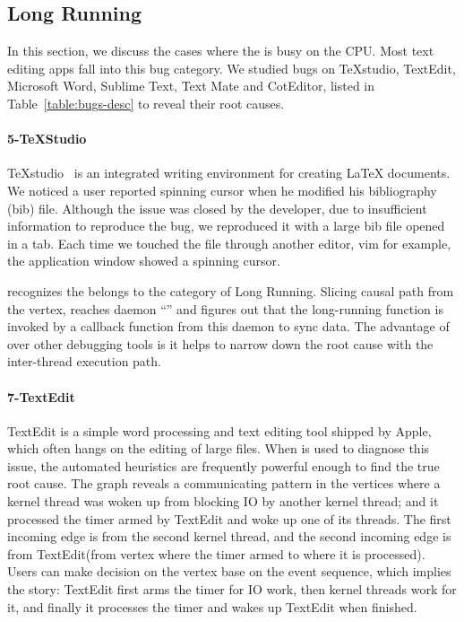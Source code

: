 \subsection{Long Running}

In this section, we discuss the cases where the \spinningnode is busy on the
CPU. Most text editing apps fall into this bug category. We studied bugs on
TeXstudio, TextEdit, Microsoft Word, Sublime Text, Text Mate and CotEditor,
listed in Table~\ref{table:bugs-desc} to reveal their root causes.


\paragraph{5-TeXStudio}

TeXstudio~\cite{TeXStudio} is an integrated writing environment for creating
LaTeX documents. We noticed a user reported spinning cursor when he
modified his bibliography (bib) file. Although the issue was closed by the developer, due to
insufficient information to reproduce the bug, we reproduced it with a large bib
file opened in a tab. Each time we touched the file through another editor, vim
for example, the application window showed a spinning cursor.

\xxx recognizes the \spinningnode belongs to the category of Long
Running. Slicing causal path from the vertex, \xxx reaches daemon
``'' and figures out that the long-running function is invoked by a callback
function from this daemon to sync data. The advantage of \xxx over other debugging tools is
it helps to narrow down the root cause with the inter-thread execution path.

\paragraph{7-TextEdit}

TextEdit is a simple word processing and text editing tool shipped by Apple, which
often hangs on the editing of large files. 
When \xxx is used to diagnose this issue, the automated heuristics are frequently
powerful enough to find the true root cause.
The graph reveals a communicating pattern in the vertices where a kernel
thread was woken up from blocking IO by another kernel thread; and it processed
the timer armed by TextEdit and woke up one of its threads. The first incoming
edge is from the second kernel thread, and the second incoming edge is from
TextEdit(from vertex where the timer armed to where it is processed). Users can
make decision on the vertex base on the event sequence, which implies the story:
TextEdit first arms the timer for IO work, then kernel threads work for it, and
finally it processes the timer and wakes up TextEdit when finished.

